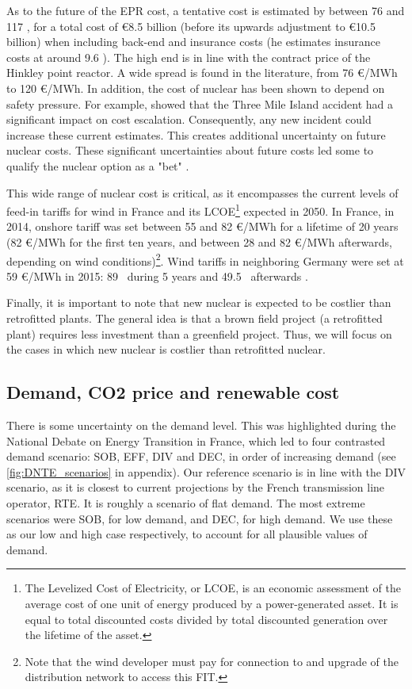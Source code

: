 As to the future of the EPR cost, a tentative cost is estimated by \citet{Boccard2014} between 76 and 117 \emwh, for a total cost of \euro 8.5 billion (before its upwards adjustment to \euro 10.5 billion) when including back-end and insurance costs (he estimates insurance costs at around 9.6 \emwh). 
The high end is in line with the contract price of the Hinkley point reactor. A wide spread is found in the literature, from 76 \euro/MWh to 120 \euro/MWh.
In addition, the cost of nuclear has been shown to depend on safety pressure. For example, \citet{Cooper2011} showed that the Three Mile Island accident had a significant impact on cost escalation.
Consequently, any new incident could increase these current estimates. This creates additional uncertainty on future nuclear costs.
These significant uncertainties about future costs led some to qualify the nuclear option as a "bet" \citep{Leveque2013}.

This wide range of nuclear cost is critical, as it encompasses the current levels of feed-in tariffs for wind in France and its LCOE\footnote{
	The Levelized Cost of Electricity, or LCOE, is an economic assessment of the average cost of one unit of energy produced by a power-generated asset. It is equal to total discounted costs divided by total discounted generation over the lifetime of the asset.}
expected in 2050. 
In France, in 2014, onshore tariff was set between 55 and 82 \euro/MWh for a lifetime of 20 years (82 \euro/MWh for the first ten years, and between 28 and 82 \euro/MWh afterwards, depending on wind conditions)\footnote{
	Note that the wind developer must pay for connection to and upgrade of the distribution network to access this FIT.
}.
Wind tariffs in neighboring Germany were set at 59 \euro/MWh in 2015: 89 \emwh\ during 5 years and 49.5 \emwh\ afterwards \citep{EEG2014}.

Finally, it is important to note that new nuclear is expected to be costlier than retrofitted plants. The general idea is that a brown field project (a retrofitted plant) requires less investment than a greenfield project. Thus, we will focus on the cases in which new nuclear is costlier than retrofitted nuclear.


\subsection{Demand, CO2 price and renewable cost}
\label{subsec:demand}

There is some uncertainty on the demand level. This was highlighted during the National Debate on Energy Transition in France, which led to four contrasted demand scenario: SOB, EFF, DIV and DEC, in order of increasing demand (see \cref{fig:DNTE_scenarios} in appendix). 
Our reference scenario is in line with the DIV scenario, as it is closest to current projections by the French transmission line operator, RTE. It is roughly a scenario of flat demand. The most extreme scenarios were SOB, for low demand, and DEC, for high demand. We use these as our low and high case respectively, to account for all plausible values of demand.

